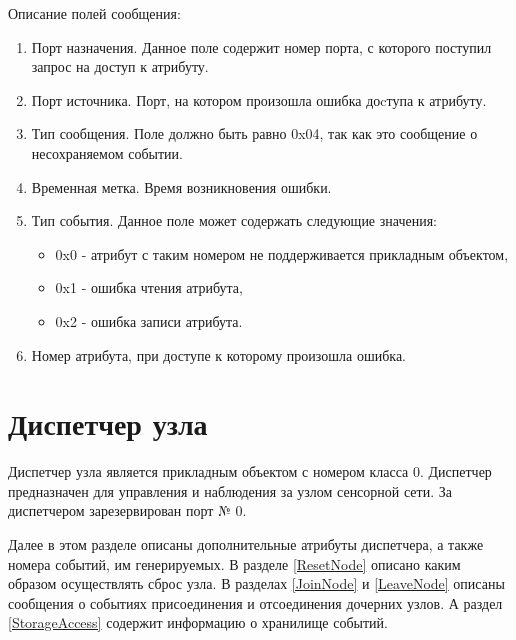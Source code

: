 Описание полей сообщения:
\begin{enumerate}
\item Порт назначения. Данное поле содержит номер порта, с которого поступил 
запрос на доступ к атрибуту.
\item Порт источника. Порт, на котором произошла ошибка доcтупа к атрибуту.
\item Тип сообщения. Поле должно быть равно 0x04, так как это сообщение о несохраняемом событии.
\item Временная метка. Время возникновения ошибки.
\item Тип события. Данное поле может содержать следующие значения:
    \begin{itemize}
        \item 0x0 - атрибут с таким номером не поддерживается прикладным объектом,
        \item 0x1 - ошибка чтения атрибута,
        \item 0x2 - ошибка записи атрибута.
    \end{itemize}
\item Номер атрибута, при доступе к которому произошла ошибка.
\end{enumerate}


\section{Диспетчер узла}

Диспетчер узла является прикладным объектом с номером класса 0. Диспетчер предназначен 
для управления и наблюдения за узлом сенсорной сети. За диспетчером зарезервирован порт № 0.

Далее в этом разделе описаны дополнительные атрибуты диспетчера, а также номера событий, им генерируемых.
В разделе \ref{ResetNode} описано каким образом осуществлять сброс узла. В разделах \ref{JoinNode} и \ref{LeaveNode} описаны сообщения
о событиях присоединения и отсоединения дочерних узлов. А раздел \ref{StorageAccess} содержит информацию о хранилище событий.

